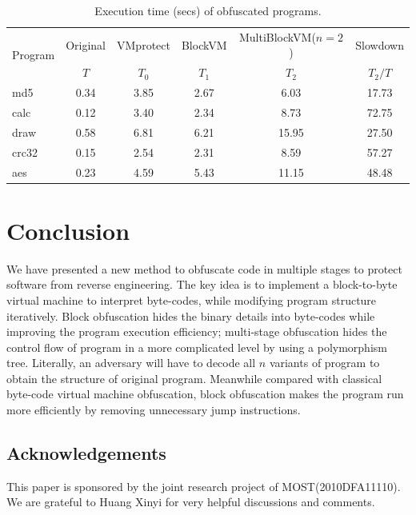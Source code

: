 \documentclass{../style/llncs}                   %
\begin{document}
\begin{table}  \centering
\caption{Execution time (secs) of obfuscated programs. } \label{tab_obf_exe_time}
\small %
\begin{tabular}{ |l|c|c|c|c|c| }
\hline
 \multirow{2}{*}{Program} & Original &  VMprotect & BlockVM & MultiBlockVM($n=2$) & Slowdown \\
                          & $T$      &   $T_0$    & $T_1$   & $T_2$               &  $T_2/T$ \\
\hline \hline
 md5  &  0.34  & 3.85 & 2.67 & 6.03  & 17.73 \\
 calc  & 0.12  & 3.40 & 2.34 &  8.73 & 72.75 \\
 draw  & 0.58  & 6.81 & 6.21 & 15.95 & 27.50 \\
 crc32 & 0.15  & 2.54 & 2.31 & 8.59  & 57.27 \\
 aes   & 0.23  & 4.59 & 5.43 & 11.15 & 48.48 \\
\hline
\end{tabular}
\end{table}





\section{Conclusion} \label{section_conclusion}

We have presented a new method to obfuscate code in multiple stages to protect software
from reverse engineering. The key idea is to implement a block-to-byte virtual machine to
interpret byte-codes, while modifying program structure iteratively.
Block obfuscation hides the binary details into byte-codes while improving the program execution efficiency;
multi-stage obfuscation hides the control flow of program in a more complicated level
by using a polymorphism tree.
Literally, an adversary will have to decode all $n$ variants of program to obtain
the structure of original program.
Meanwhile compared with classical byte-code virtual machine obfuscation,
block obfuscation makes the program run more efficiently by removing unnecessary
jump instructions. 



\subsection*{Acknowledgements}
This paper is sponsored by the joint research project of MOST(2010DFA11110). 
We are grateful to Huang Xinyi for very helpful discussions and comments.
\end{document}
